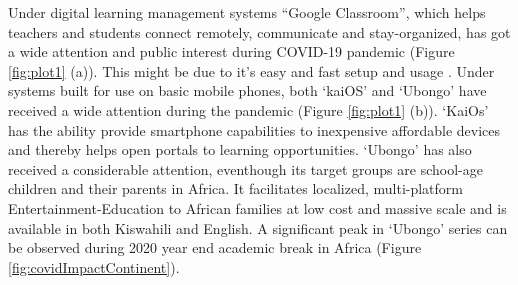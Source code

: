 \documentclass[11pt,a4paper,]{article}
\begin{document}
Under digital learning management systems ``Google Classroom'', which helps teachers and students connect remotely, communicate and stay-organized, has got a wide attention and public interest during COVID-19 pandemic (Figure \ref{fig:plot1} (a)). This might be due to it's easy and fast setup and usage \autocite{sudarsana2019use}. Under systems built for use on basic mobile phones, both `kaiOS' and `Ubongo' have received a wide attention during the pandemic (Figure \ref{fig:plot1} (b)).
`KaiOs' has the ability provide smartphone capabilities to inexpensive affordable devices and thereby helps open portals to learning opportunities. `Ubongo' has also received a considerable attention, eventhough its target groups are school-age children and their parents in Africa. It facilitates localized, multi-platform Entertainment-Education to African families at low cost and massive scale and is available in both Kiswahili and English. A significant peak in `Ubongo' series can be observed during 2020 year end academic break in Africa (Figure \ref{fig:covidImpactContinent}).
\end{document}
